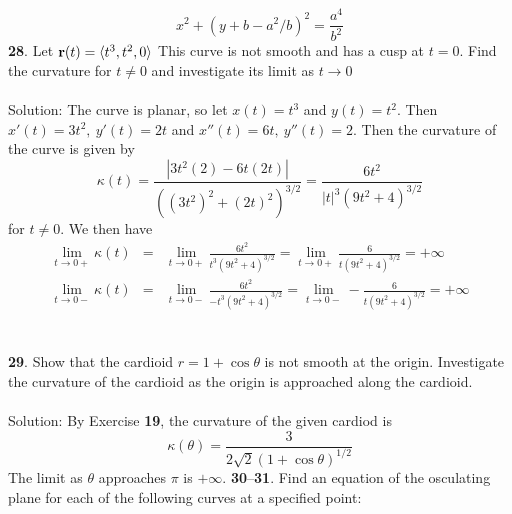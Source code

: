 \documentclass[12pt]{amsbook}
\newcommand{\la}{\langle}
\newcommand{\ra}{\rangle}
\begin{document}
$$x^2+(y+b-a^2/b)^2=\frac{a^4}{b^2}$$
{\small\bf 28}. Let ${\bf r}(t) = \la t^3,t^2,0 \ra$ This curve is not smooth and has a cusp at $t = 0$.
Find the curvature for $t\neq 0$ and investigate its limit as $t \rightarrow 0$
\\
\\
{\sc Solution}: The curve is planar, so let $x(t)=t^3$ and $y(t)=t^2$. Then $x'(t)=3t^2, \ y'(t)=2t$ and $x''(t)=6t, \ y''(t)=2$. Then the curvature of the curve is given by
$$\kappa(t)=\frac{|3t^2(2)-6t(2t)|}{((3t^2)^2+(2t)^2)^{3/2}}=\frac{6t^2}{|t|^3(9t^2+4)^{3/2}}$$
for $t\neq 0$. We then have
\begin{eqnarray*}
\lim_{t\rightarrow 0+}\kappa(t)&=&\lim_{t\rightarrow 0+}\frac{6t^2}{t^3(9t^2+4)^{3/2}}=\lim_{t\rightarrow 0+}\frac{6}{t(9t^2+4)^{3/2}}=+\infty\\
\lim_{t\rightarrow 0-}\kappa(t)&=&\lim_{t\rightarrow 0-}\frac{6t^2}{-t^3(9t^2+4)^{3/2}}=\lim_{t\rightarrow 0-}-\frac{6}{t(9t^2+4)^{3/2}}=+\infty
\end{eqnarray*}
\\
\\
{\small\bf 29}. Show that the cardioid $r = 1 + \cos \theta$ is not smooth at the origin. Investigate
the curvature of the cardioid as the origin is approached along the
cardioid.
\\
\\
{\sc Solution}: By Exercise {\bf 19}, the curvature of the given cardiod is
$$\kappa(\theta)=\frac{3}{2\sqrt{2}(1+\cos \theta)^{1/2}}$$
The limit as $\theta$ approaches $\pi$ is $+\infty$.
\noindent
{\small {\bf 30}--{\bf 31}}. Find an equation of the osculating plane for each of the following
curves at a specified point:
\end{document}
